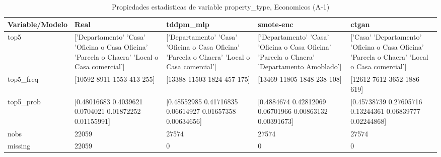 \begin{table}[H]
\centering
\fontsize{8}{14}\selectfont
\caption{Propiedades  estadisticas de variable property\_type, Economicos (A-1)}
\label{table-stats-economicos-a-1-property_type}
\begin{tabular}{|l|m{10em}|m{10em}|m{10em}|m{10em}|}
\hline
 \rowcolor[gray]{0.8}
Variable/Modelo & Real & tddpm\_mlp & smote-enc & ctgan \\
\hline top5 & ['Departamento' 'Casa' 'Oficina o Casa Oficina' 'Parcela o Chacra'
 'Local o Casa comercial'] & ['Departamento' 'Casa' 'Oficina o Casa Oficina' 'Parcela o Chacra'
 'Local o Casa comercial'] & ['Departamento' 'Casa' 'Oficina o Casa Oficina' 'Parcela o Chacra'
 'Departamento Amoblado'] & ['Casa' 'Departamento' 'Oficina o Casa Oficina' 'Parcela o Chacra'
 'Local o Casa comercial'] \\
\hline top5\_freq & [10592  8911  1553   413   255] & [13388 11503  1824   457   175] & [13469 11805  1848   238   108] & [12612  7612  3652  1886   619] \\
\hline top5\_prob & [0.48016683 0.4039621  0.0704021  0.01872252 0.01155991] & [0.48552985 0.41716835 0.06614927 0.01657358 0.00634656] & [0.4884674  0.42812069 0.06701966 0.00863132 0.00391673] & [0.45738739 0.27605716 0.13244361 0.06839777 0.02244868] \\
\hline nobs & 22059 & 27574 & 27574 & 27574 \\
\hline missing & 22059 & 0 & 0 & 0 \\
\hline
\end{tabular}
\end{table}
